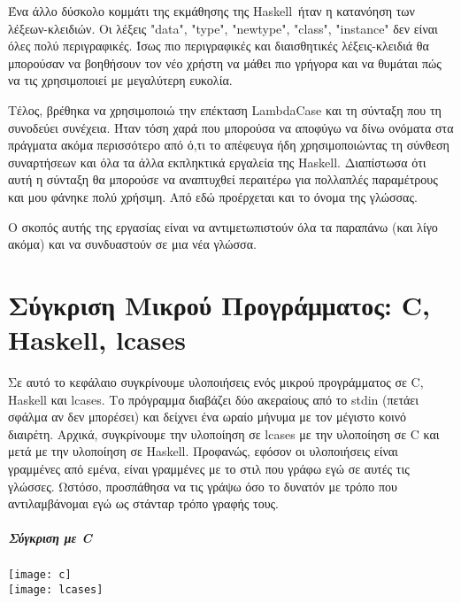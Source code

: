 \documentclass[diploma]{softlab-thesis}
\def\H{Haskell}
\begin{document}
Ένα άλλο δύσκολο κομμάτι της εκμάθησης της \H\ ήταν η κατανόηση των
λέξεων-κλειδιών. Οι λέξεις "data", "type", "newtype", "class", "instance" δεν
είναι όλες πολύ περιγραφικές. Ίσως πιο περιγραφικές και διαισθητικές
λέξεις-κλειδιά θα μπορούσαν να βοηθήσουν τον νέο χρήστη να μάθει
πιο γρήγορα και να θυμάται πώς να τις χρησιμοποιεί με μεγαλύτερη ευκολία.

Τέλος, βρέθηκα να χρησιμοποιώ την επέκταση LambdaCase και τη σύνταξη που τη
συνοδεύει συνέχεια. Ήταν τόση χαρά που μπορούσα να αποφύγω να δίνω
ονόματα στα πράγματα ακόμα περισσότερο από ό,τι το απέφευγα ήδη
χρησιμοποιώντας τη σύνθεση συναρτήσεων και όλα τα άλλα εκπληκτικά
εργαλεία της \H. Διαπίστωσα ότι
αυτή η σύνταξη θα μπορούσε να αναπτυχθεί περαιτέρω για πολλαπλές
παραμέτρους και μου φάνηκε πολύ χρήσιμη. Από εδώ προέρχεται και το
όνομα της γλώσσας.

Ο σκοπός αυτής της εργασίας είναι να αντιμετωπιστούν όλα τα παραπάνω
(και λίγο ακόμα) και να συνδυαστούν σε μια νέα γλώσσα.

\chapter{Σύγκριση Μικρού Προγράμματος: C, Haskell, lcases}

Σε αυτό το κεφάλαιο συγκρίνουμε υλοποιήσεις ενός μικρού προγράμματος σε C,
Haskell και lcases. Το πρόγραμμα διαβάζει δύο ακεραίους από το stdin (πετάει
σφάλμα αν δεν μπορέσει) και δείχνει ένα ωραίο μήνυμα με τον μέγιστο κοινό
διαιρέτη. Αρχικά, συγκρίνουμε την υλοποίηση σε lcases με την υλοποίηση σε C και
μετά με την υλοποίηση σε \H. Προφανώς, εφόσον οι υλοποιήσεις είναι γραμμένες
από εμένα, είναι γραμμένες με το στιλ που γράφω εγώ σε αυτές τις γλώσσες.
Ωστόσο, προσπάθησα να τις γράψω όσο το δυνατόν με τρόπο που αντιλαμβάνομαι εγώ
ως στάνταρ τρόπο γραφής τους.

\paragraph{Σύγκριση με C}

\begin{center}
\texttt{[image: c]}\\
\vspace{0.2cm}
\texttt{[image: lcases]}
\end{center}
\newpage
\end{document}
